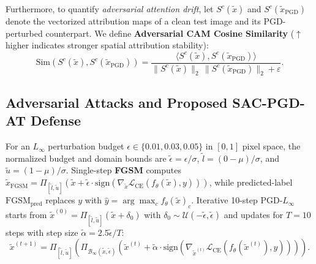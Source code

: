 \documentclass[final,5p,times,twocolumn]{elsarticle}
\begin{document}
Furthermore, to quantify \emph{adversarial attention drift}, let $S^c(\tilde{x})$ and $S^c(\tilde{x}_{\text{PGD}})$ denote the vectorized attribution maps of a clean test image and its PGD-perturbed counterpart. We define \textbf{Adversarial CAM Cosine Similarity} ($\uparrow$ higher indicates stronger spatial attribution stability):
\begin{equation}
    \text{Sim}\!\left(S^c(\tilde{x}), S^c(\tilde{x}_{\text{PGD}})\right) = \frac{\langle S^c(\tilde{x}), S^c(\tilde{x}_{\text{PGD}}) \rangle}{\|S^c(\tilde{x})\|_2 \, \|S^c(\tilde{x}_{\text{PGD}})\|_2 + \varepsilon}.
    \label{eq:cam_sim}
\end{equation}

\subsection{Adversarial Attacks and Proposed SAC-PGD-AT Defense}
For an $L_\infty$ perturbation budget $\epsilon \in \{0.01, 0.03, 0.05\}$ in $[0,1]$ pixel space, the normalized budget and domain bounds are $\tilde{\epsilon} = \epsilon/\sigma$, $\tilde{l} = (0-\mu)/\sigma$, and $\tilde{u} = (1-\mu)/\sigma$. Single-step \textbf{FGSM} \cite{goodfellow2015explaining} computes $\tilde{x}_{\text{FGSM}} = \Pi_{[\tilde{l},\tilde{u}]}(\tilde{x} + \tilde{\epsilon} \cdot \text{sign}(\nabla_{\tilde{x}} \mathcal{L}_{\text{CE}}(f_\theta(\tilde{x}), y)))$, while predicted-label $\text{FGSM}_{\text{pred}}$ \cite{kurakin2017adversarial} replaces $y$ with $\hat{y} = \arg\max_c f_\theta(\tilde{x})_c$. Iterative 10-step $\text{PGD-}L_\infty$ \cite{madry2018towards} starts from $\tilde{x}^{(0)} = \Pi_{[\tilde{l},\tilde{u}]}(\tilde{x} + \delta_0)$ with $\delta_0 \sim \mathcal{U}(-\tilde{\epsilon}, \tilde{\epsilon})$ and updates for $T=10$ steps with step size $\tilde{\alpha} = 2.5\tilde{\epsilon}/T$:
\begin{equation}
    \tilde{x}^{(t+1)} = \Pi_{[\tilde{l}, \tilde{u}]}\!\left( \Pi_{\mathcal{B}_\infty(\tilde{x}, \tilde{\epsilon})}\!\left( \tilde{x}^{(t)} + \tilde{\alpha} \cdot \text{sign}\!\left( \nabla_{\tilde{x}^{(t)}} \mathcal{L}_{\text{CE}}(f_\theta(\tilde{x}^{(t)}), y) \right) \right) \right).
\end{equation}
\end{document}
